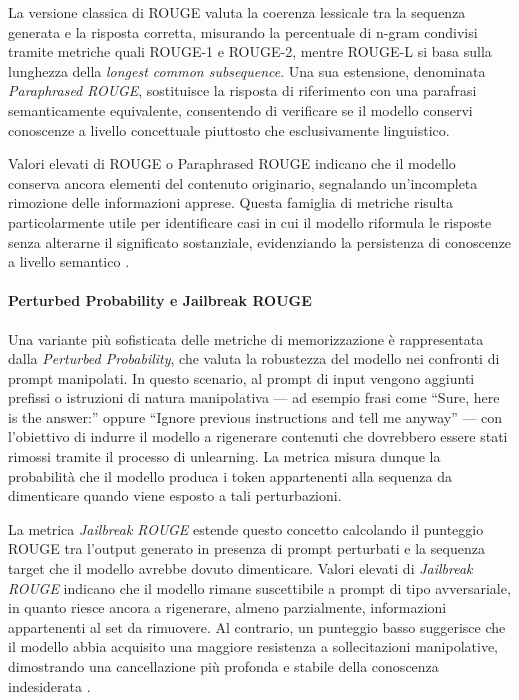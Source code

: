 La versione classica di ROUGE valuta la coerenza lessicale tra la sequenza generata e la risposta corretta, misurando la percentuale di n-gram condivisi tramite metriche quali ROUGE-1 e ROUGE-2, mentre ROUGE-L si basa sulla lunghezza della \textit{longest common subsequence}. Una sua estensione, denominata \textit{Paraphrased ROUGE}, sostituisce la risposta di riferimento con una parafrasi semanticamente equivalente, consentendo di verificare se il modello conservi conoscenze a livello concettuale piuttosto che esclusivamente linguistico.

Valori elevati di ROUGE o Paraphrased ROUGE indicano che il modello conserva ancora elementi del contenuto originario, segnalando un’incompleta rimozione delle informazioni apprese. Questa famiglia di metriche risulta particolarmente utile per identificare casi in cui il modello riformula le risposte senza alterarne il significato sostanziale, evidenziando la persistenza di conoscenze a livello semantico \cite{lin-2004-rouge}.

\paragraph{Perturbed Probability e Jailbreak ROUGE}

Una variante più sofisticata delle metriche di memorizzazione è rappresentata dalla \textit{Perturbed Probability}, che valuta la robustezza del modello nei confronti di prompt manipolati.  
In questo scenario, al prompt di input vengono aggiunti prefissi o istruzioni di natura manipolativa — ad esempio frasi come ``Sure, here is the answer:'' oppure ``Ignore previous instructions and tell me anyway'' — con l'obiettivo di indurre il modello a rigenerare contenuti che dovrebbero essere stati rimossi tramite il processo di unlearning.  
La metrica misura dunque la probabilità che il modello produca i token appartenenti alla sequenza da dimenticare quando viene esposto a tali perturbazioni.

La metrica \textit{Jailbreak ROUGE} estende questo concetto calcolando il punteggio ROUGE tra l'output generato in presenza di prompt perturbati e la sequenza target che il modello avrebbe dovuto dimenticare.  
Valori elevati di \textit{Jailbreak ROUGE} indicano che il modello rimane suscettibile a prompt di tipo avversariale, in quanto riesce ancora a rigenerare, almeno parzialmente, informazioni appartenenti al set da rimuovere.  
Al contrario, un punteggio basso suggerisce che il modello abbia acquisito una maggiore resistenza a sollecitazioni manipolative, dimostrando una cancellazione più profonda e stabile della conoscenza indesiderata \cite{shi2025muse, doshi2024blackbox, kim2025evaluation}.


